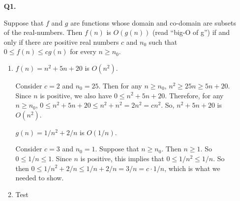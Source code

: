 \documentclass[10pt, letterpaper]{article}
\begin{document}

\begin{enumerate}
  \item[\textbf{Q1.}]
    \begin{remark*}
      Suppose that $f$ and $g$ are functions whose domain and co-domain are subsets
      of the real-numbers. Then $f(n)$ is $O(g(n))$ (read ``big-O of g'') if and only
      if there are positive real numbers $c$ and $n_0$ such that $0 \leq f(n) \leq 
      cg(n)$ for every $n \geq n_0$.
    \end{remark*}

    \begin{enumerate}
      \item
        \begin{claim*}
          \vspace{-6.7mm}
          $f(n) = n^2 + 5n + 20$ is $O(n^2)$.
        \end{claim*}

        \begin{proof*}
          Consider $c = 2$ and $n_0 = 25$. Then for any $n \geq n_0$, $n^2 \geq 25n
          \geq 5n + 20$. Since $n$ is positive, we also have $0 \leq n^2 + 5n + 20$.
          Therefore, for any $n \geq n_0$, $0 \leq n^2 + 5n + 20 \leq n^2 + n^2 = 2n^2
          = cn^2$. So, $n^2 + 5n + 20$ is $O(n^2)$.
        \end{proof*}

        \begin{claim*}
          $g(n) = 1/n^2 + 2/n$ is $O(1/n)$.
        \end{claim*}

        \begin{proof*}
          Consider $c = 3$ and $n_0 = 1$. Suppose that $n \geq n_0$. Then $n \geq 1$.
          So $0 \leq 1/n \leq 1$. Since $n$ is positive, this implies that $0 \leq 1/n^2
          \leq 1/n$. So then $0 \leq 1/n^2 + 2/n \leq 1/n + 2/n = 3/n = c \cdot 1/n$,
          which is what we needed to show.
        \end{proof*}

      \item
        Test \\
    \end{enumerate}


\end{enumerate}
\end{document}
